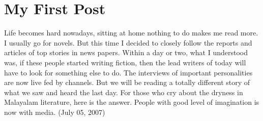 \section*{My First Post}
\vskip 2pt


Life becomes hard nowadays, sitting at home nothing to do makes me read more.
I usually go for novels. But this time I decided to closely follow the 
reports and articles of top stories in news papers. Within a day or two, 
what I understood was, if these people started writing fiction, then the 
lead writers of today will have to look for something else to do. The interviews of 
important personalities are now live fed by channels. But we will be reading
 a totally different story of what we saw and heard the last day.
For those who cry about the dryness in Malayalam literature, here is the answer. 
People with good level of imagination is now with media. (July 05, 2007)
\newpage
